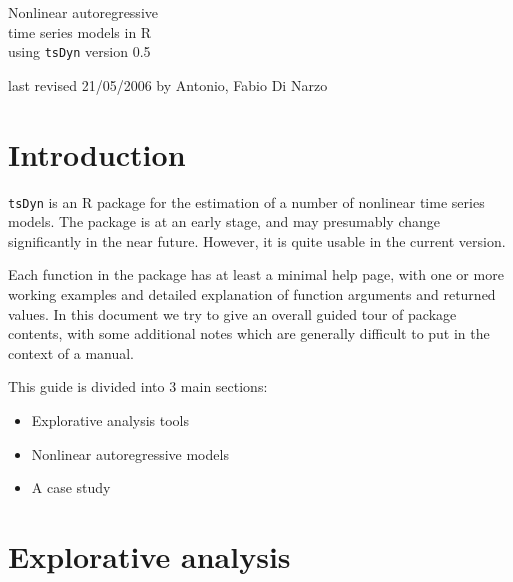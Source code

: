 \documentclass[a4paper]{article}
\newcommand{\tsDyn}{\texttt{tsDyn} }
\begin{document}
\begin{titlepage}
{\centering \huge Nonlinear autoregressive\\[0.5cm]
time series models in R\\[0.5cm]
using \tsDyn version 0.5\\}
\vfill\par
{\centering last revised 21/05/2006 by Antonio, Fabio Di Narzo\\}
\end{titlepage}

\section{Introduction} \tsDyn is an R package for the estimation of
a number of nonlinear time series models.  The package is at an early stage, and
may presumably change significantly in the near future. However, it is
quite usable in the current version.

Each function in the package has at least a minimal help page, with
one or more working examples and detailed explanation of function
arguments and returned values.  In this document we try to
give an overall guided tour of package contents, with some
additional notes which are generally difficult to put in the context
of a manual.

This guide is divided into 3 main sections:
\begin{itemize}
\item Explorative analysis tools
\item Nonlinear autoregressive models
\item A case study
\end{itemize}

\section{Explorative analysis}
\end{document}
